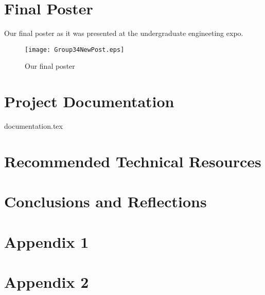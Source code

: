 \documentclass[onecolumn, draftclsnofoot,10pt, compsoc]{IEEEtran}
\begin{document}
	\section{Final Poster}	
		Our final poster as it was presented at the undergraduate engineeting expo. 	
		\begin{figure}[!hb]
			\centering
			\texttt{[image: Group34NewPost.eps]}
			\caption{Our final poster}
		\end{figure}

	\section{Project Documentation}
	{documentation.tex}
	
	\section{Recommended Technical Resources}
	
	\section{Conclusions and Reflections}
	\section{Appendix 1}
	\section{Appendix 2}
	
	
	
	
	
\end{document}
